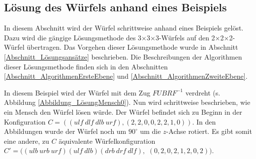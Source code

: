 \documentclass[12pt,a4paper, usenames, dvipsnames]{article}
\theoremstyle{mystyle}
\theoremstyle{definition}
\newcommand{\Ttwo}{2$\times$2$\times$2-}
\newcommand{\Tthree}{3$\times$3$\times$3-}
\begin{document}



%
%
%
%
%
%
%
%
%
%
%
%
%
%
%
%
%
%
%
%
\subsection{Lösung des Würfels anhand eines Beispiels}

\label{Abschnitt_LösungBeispiel}

In diesem Abschnitt wird der Würfel schrittweise anhand eines Beispiels gelöst. Dazu wird die gängige Lösungsmethode des \Tthree Würfels auf den \Ttwo Würfel übertragen. Das Vorgehen dieser Lösungsmethode wurde in Abschnitt \ref{Abschnitt_Lösungsansätze} beschrieben. Die Beschreibungen der Algorithmen dieser Lösungsmethode finden sich in den Abschnitten \ref{Abschnitt_AlgorithmenErsteEbene} und \ref{Abschnitt_AlgorithmenZweiteEbene}.

In diesem Beispiel wird der Würfel mit dem Zug $FUBRF^{-1}$ verdreht (s. Abbildung \ref{Abbildung_LösungMensch0}). Nun wird schrittweise beschrieben, wie ein Mensch den Würfel lösen würde. Der Würfel befindet sich zu Beginn in der Konfiguration $C = ((\textit{ulf} \ \textit{dlf} \ \textit{dlb} \ \textit{urf}),(2,2,0,0,2,2,1,0))$.
In den Abbildungen wurde der Würfel noch um $90^\circ$ um die $z$-Achse rotiert. Es gibt somit eine andere, zu $C$ äquivalente Würfelkonfiguration $C'=(( \textit{ulb} \ \textit{urb} \ \textit{urf})( \textit{ulf} \ \textit{dlb} )(\textit{drb} \ \textit{drf} \ \textit{dlf}),$ $(0,2,0,2,1,2,0,2))$.
\end{document}
